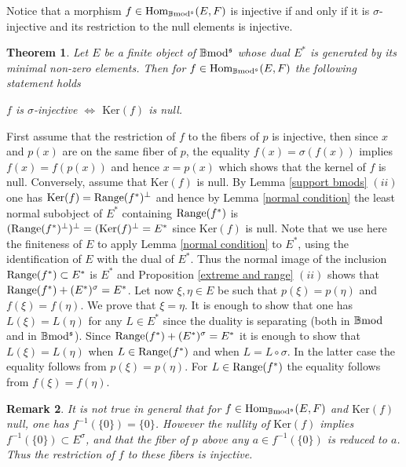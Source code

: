 \documentclass[12pt]{article}
\newtheorem{thm}{Theorem}[section]
\newtheorem{rem}[thm]{Remark}
\def\Hom{{\rm Hom}}
\def\B{{\mathbb B}}
\def\ker{{\mbox{Ker}}}
\def\Hom {{\mbox{Hom}}}
\def\bmod{{\rm \B mod}}
\def\b2{{\rm \B mod^{\mathfrak s}}}
\begin{document}
Notice that a morphism $f\in \Hom_\b2(E,F)$ is injective if and only if it is $\sigma$-injective and its restriction to the null elements is injective.
   \begin{thm}\label{kernel and injective} Let $E$ be a finite object of $\b2$ whose dual $E^*$ is generated by its minimal non-zero elements. Then for $f\in \Hom_\b2(E,F)$ the following statement holds \vspace{.05in}
   
   \centerline{$f$ is $\sigma$-injective $\iff$ $\ker(f)$ is null.}   	
   \end{thm}
   \proof First assume that the restriction of $f$ to the fibers of $p$ is injective, then since $x$ and $p(x)$ are on the same fiber of $p$, the equality $f(x)=\sigma(f(x))$ implies $f(x)=f(p(x))$ and hence $x=p(x)$ which shows that the kernel of $f$ is null. Conversely, assume that $\ker(f)$ is null.  By Lemma  \ref{support bmods} $(ii)$ one has $\ker(f)={\rm Range}(f^*)^\perp$ and hence by Lemma \ref{normal condition} the least normal subobject of $E^*$ containing ${\rm Range}(f^*)$ is $({\rm Range}(f^*)^\perp)^\perp=(\ker(f)^\perp=E^*$ since $\ker(f)$ is null. Note that we use here the finiteness of $E$ to apply Lemma \ref{normal condition} to $E^*$, using the identification of $E$ with the dual of $E^*$. Thus the normal image of the inclusion ${\rm Range}(f^*)\subset E^*$ is $E^*$ and  Proposition \ref{extreme and range} $(ii)$ shows that ${\rm Range}(f^*)+(E^*)^\sigma=E^*$. Let now $\xi, \eta\in E$ be such that $p(\xi)=p(\eta)$ and $f(\xi)=f(\eta)$. We prove that $\xi=\eta$. It is enough to show that one has $L(\xi)=L(\eta)$ for any $L\in E^*$ since the duality is separating (both in $\bmod$ and in $\b2$). Since ${\rm Range}(f^*)+(E^*)^\sigma=E^*$ it is enough to show that $L(\xi)=L(\eta)$ when $L\in {\rm Range}(f^*)$ and when $L=L\circ \sigma$. In the latter case the equality follows from $p(\xi)=p(\eta)$. For $L\in {\rm Range}(f^*)$ the equality follows from $f(\xi)=f(\eta)$. \endproof 
   \begin{rem}\label{trivial kernel} It is not true in general that for $f\in \Hom_\b2(E,F)$ and $\ker(f)$ null, one has $f^{-1}(\{0\})=\{0\}$. However the nullity of $\ker(f)$ implies  $f^{-1}(\{0\})\subset E^\sigma$, and that the fiber of $p$ above any  $a\in f^{-1}(\{0\})$ is reduced to $a$. Thus the restriction of $f$ to these fibers is injective.   	
   \end{rem}
\end{document}
